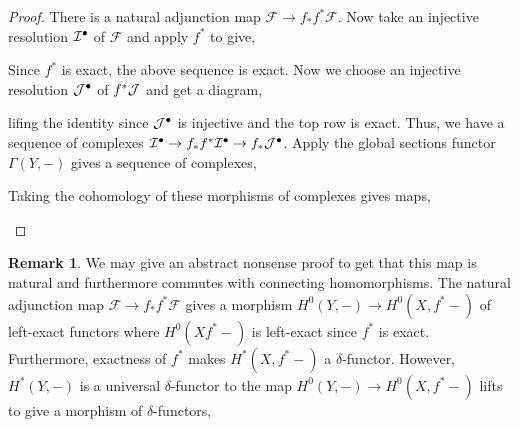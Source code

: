 \documentclass[12pt]{extarticle}
\theoremstyle{definition}
\newtheorem{remark}{Remark}
\newcommand{\F}{\mathcal{F}}
\begin{document}
\begin{proof}
There is a natural adjunction map $\F \to f_* f^* \F$. Now take an injective resolution $\mathcal{I}^\bullet$ of $\F$ and apply $f^*$ to give,
\begin{center}
\end{center}
Since $f^*$ is exact, the above sequence is exact. Now we choose an injective resolution $\mathcal{J}^\bullet$ of $f^* \mathcal{J}$ and get a diagram,
\begin{center}
\end{center}
lifing the identity since $\mathcal{J}^\bullet$ is injective and the top row is exact. Thus, we have a sequence of complexes $\mathcal{I}^\bullet \to f_* f^* \mathcal{I}^\bullet \to f_* \mathcal{J}^\bullet$. Apply the global sections functor $\Gamma(Y, -)$ gives a sequence of complexes,
\begin{center}
\end{center}
Taking the cohomology of these morphisms of complexes gives maps,
\begin{center}
\end{center}
\end{proof}

\begin{remark}
We may give an abstract nonsense proof to get that this map is natural and furthermore commutes with connecting homomorphisms. The natural adjunction map $\F \to f_* f^* \F$ gives a morphism $H^0(Y, -) \to H^0(X, f^* -)$ of left-exact functors where $H^0(X f^* -)$ is left-exact since $f^*$ is exact. Furthermore, exactness of $f^*$ makes $H^*(X, f^* - )$ a $\delta$-functor. However, $H^*(Y, -)$ is a universal $\delta$-functor to the map $H^0(Y, -) \to H^0(X, f^* - )$ lifts to give a morphism of $\delta$-functors,  \begin{center}
\end{center} 
\end{remark}
\end{document}

